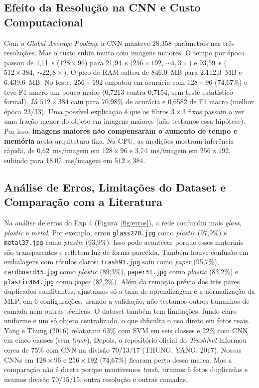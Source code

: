 \documentclass[11pt,a4paper]{article}
\begin{document}
\subsection{Efeito da Resolução na CNN e Custo Computacional}

Com o \textit{Global Average Pooling}, a CNN manteve 28.358 parâmetros nas três resoluções. Mas o custo subiu muito com imagens maiores. O tempo por época passou de 4,11~s ($128 \times 96$) para 21,94~s ($256 \times 192$, ${\sim}5{,}3\times$) e 93,59~s ($512 \times 384$, ${\sim}22{,}8\times$). O pico de RAM saltou de 846,0~MB para 2.112,3~MB e 6.439,6~MB. No teste, $256 \times 192$ empatou em acurácia com $128 \times 96$ (74,67\%) e teve F1 macro um pouco maior (0,7213 contra 0,7154, sem teste estatístico formal). Já $512 \times 384$ caiu para 70,98\% de acurácia e 0,6582 de F1 macro (melhor época 23/33). Uma possível explicação é que os filtros $3\times 3$ fixos passam a ver uma fração menor do objeto em imagens maiores (não testamos essa hipótese). Por isso, \textbf{imagens maiores não compensaram o aumento de tempo e memória} nesta arquitetura fixa. Na CPU, as medições mostram inferência rápida, de 0,62~ms/imagem em $128 \times 96$ e 3,74~ms/imagem em $256 \times 192$, subindo para 18,07~ms/imagem em $512 \times 384$.

\subsection{Análise de Erros, Limitações do Dataset e Comparação com a Literatura}

Na análise de erros do Exp 4 (Figura~\ref{fig:erros}), a rede confundiu mais \textit{glass}, \textit{plastic} e \textit{metal}. Por exemplo, errou \texttt{glass270.jpg} como \textit{plastic} (97,9\%) e \texttt{metal37.jpg} como \textit{plastic} (93,9\%). Isso pode acontecer porque esses materiais são transparentes e refletem luz de forma parecida. Também houve confusão em embalagens com rótulos claros: \texttt{trash91.jpg} saiu como \textit{paper} (95,7\%), \texttt{cardboard33.jpg} como \textit{plastic} (89,3\%), \texttt{paper31.jpg} como \textit{plastic} (83,2\%) e \texttt{plastic364.jpg} como \textit{paper} (82,2\%). Além da remoção prévia dos três pares duplicados conflitantes, ajustamos só a taxa de aprendizagem e a normalização da MLP, em 6 configurações, usando a validação; não testamos outros tamanhos de camada nem outras técnicas. O dataset também tem limitações: fundo claro uniforme e um só objeto centralizado, o que dificulta o uso direto em fotos reais. Yang e Thung (2016) relataram 63\% com SVM em seis classes e 22\% com CNN em cinco classes (sem \textit{trash}). Depois, o repositório oficial do \textit{TrashNet} informou cerca de 75\% com CNN na divisão 70/13/17 (THUNG; YANG, 2017). Nossas CNNs em $128 \times 96$ e $256 \times 192$ (74,67\%) ficaram perto dessa marca. Mas a comparação não é direta porque mantivemos \textit{trash}, tiramos 6 fotos duplicadas e usamos divisão 70/15/15, outra resolução e outras camadas.
\end{document}
